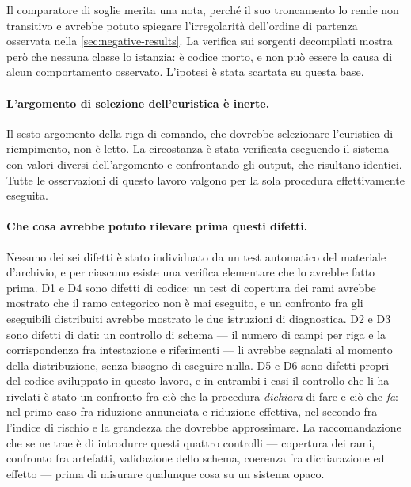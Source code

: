 \begin{observation}
Il comparatore di soglie merita una nota, perché il suo troncamento lo rende non transitivo e
avrebbe potuto spiegare l'irregolarità dell'ordine di partenza osservata nella
\autoref{sec:negative-results}. La verifica sui sorgenti decompilati mostra però che nessuna
classe lo istanzia: è codice morto, e non può essere la causa di alcun comportamento osservato.
L'ipotesi è stata scartata su questa base.
\end{observation}

\paragraph{L'argomento di selezione dell'euristica è inerte.} Il sesto argomento della riga di
comando, che dovrebbe selezionare l'euristica di riempimento, non è letto. La circostanza è
stata verificata eseguendo il sistema con valori diversi dell'argomento e confrontando gli
output, che risultano identici. Tutte le osservazioni di questo lavoro valgono per la sola
procedura effettivamente eseguita.

\paragraph{Che cosa avrebbe potuto rilevare prima questi difetti.} Nessuno dei sei difetti è stato
individuato da un test automatico del materiale d'archivio, e per ciascuno esiste una verifica
elementare che lo avrebbe fatto prima. D1 e D4 sono difetti di codice: un test di copertura dei
rami avrebbe mostrato che il ramo categorico non è mai eseguito, e un confronto fra gli eseguibili
distribuiti avrebbe mostrato le due istruzioni di diagnostica. D2 e D3 sono difetti di dati: un
controllo di schema --- il numero di campi per riga e la corrispondenza fra intestazione e
riferimenti --- li avrebbe segnalati al momento della distribuzione, senza bisogno di eseguire
nulla. D5 e D6 sono difetti propri del codice sviluppato in questo lavoro, e in entrambi i casi il
controllo che li ha rivelati è stato un confronto fra ciò che la procedura \emph{dichiara} di fare
e ciò che \emph{fa}: nel primo caso fra riduzione annunciata e riduzione effettiva, nel secondo fra
l'indice di rischio e la grandezza che dovrebbe approssimare. La raccomandazione che se ne trae è
di introdurre questi quattro controlli --- copertura dei rami, confronto fra artefatti, validazione
dello schema, coerenza fra dichiarazione ed effetto --- prima di misurare qualunque cosa su un
sistema opaco.

